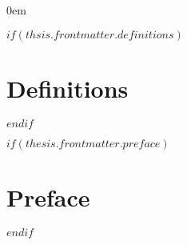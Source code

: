 \documentclass[letterpaper,             %
               oneside,                 %
               \pointsize]              %
               {memoir}
\newlength{\levelindentincrement}       %
\newlength{\levelindent}                %
\begin{document}
\pagestyle{ASUtoc}
\tableofcontents*                       %
{\setlength{\cftchapterindent}%
	{0em}%
}

\clearpage
\pagestyle{ASUlot}
\listoftables                         %
\clearpage

\pagestyle{ASUlof}
\listoffigures                        %

$if(thsis.frontmatter.definitions)$
\chapter{Definitions}                  %
$endif$

$if(thesis.frontmatter.preface)$
\chapter{Preface}                      %
$endif$

{\setlength{\cftchapterindent}%
	{\levelindentincrement}%
}
\setlength{\afterchapskip}%
{\baselineskip}                       %

{}    %
{}%
{\protect{}}    %

\iftoggle{usemicrotype}                 %
{\microtypesetup{protrusion=true}}%
{}
\end{document}
